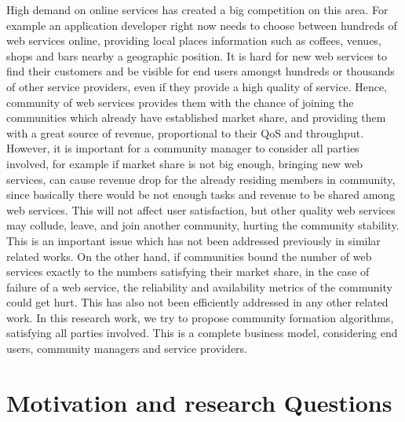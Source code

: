  
High demand on online services has created a big competition on this area. For example an application developer right now needs to choose between hundreds of web services online, providing local places information such as coffees, venues, shops and bars nearby a geographic position. It is hard for new web services to find their customers and be visible for end users amongst hundreds or thousands of other service providers, even if they provide a high quality of service. Hence, community of web services provides them with the chance of joining the communities which already have established market share, and providing them with a great source of revenue, proportional to their QoS and throughput. However, it is important for a community manager to consider all parties involved, for example if market share is not big enough, bringing new web services, can cause revenue drop for the already residing members in community,   since basically there would be not enough tasks and revenue to be shared among web services. This will not affect user satisfaction, but other quality web services may collude, leave, and join another community, hurting the community stability. This is an important issue which has not been addressed previously in similar related works. On the other hand, if communities bound the number of web services exactly to the numbers satisfying their market share, in the case of failure of a web service, the reliability and availability metrics of the community could get hurt. This has also not been efficiently addressed in any other related work. In this research work, we try to propose community formation algorithms, satisfying all parties involved. This is a complete business model, considering end users, community managers and service providers.


\section{Motivation and research Questions}\label{sec:researchquestions}

